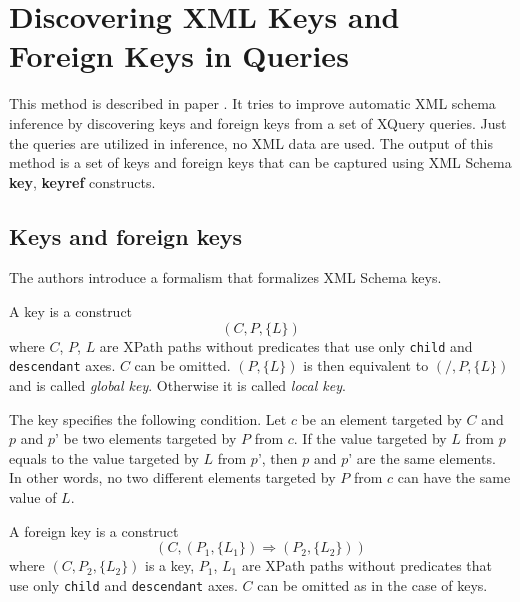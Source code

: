 
\section{Discovering XML Keys and Foreign Keys in Queries}
This method is described in paper \cite{Necasky:2009:DXK:1529282.1529414}. It tries to improve automatic XML schema inference by discovering keys and foreign keys from a set of XQuery queries. Just the queries are utilized in inference, no XML data are used. The output of this method is a set of keys and foreign keys that can be captured using XML Schema \textbf{key}, \textbf{keyref}  constructs.

\subsection{Keys and foreign keys}
The authors introduce a formalism that formalizes XML Schema keys.


\begin{define}[Key]
A key is a construct $$(C, P, \{L\})$$ where $C$, $P$, $L$ are XPath paths without predicates that use only \texttt{child} and \texttt{descendant} axes.
$C$ can be omitted. $(P, \{L\})$ is then equivalent to $(/, P, \{L\})$ and is called \emph{global key}. Otherwise it is called \emph{local key}.
\end{define}

The key specifies the following condition. Let $c$ be an element targeted by $C$ and $p$ and $p’$ be two elements targeted by $P$ from $c$. If the value targeted by $L$ from $p$ equals to the value targeted by $L$ from $p’$, then $p$ and $p’$ are the same elements. In other words, no two different elements targeted by $P$ from $c$ can have the same value of $L$.

\begin{define}
A foreign key is a construct $$(C, (P_1, \{L_1\}) \Rightarrow (P_2, \{L_2\}))$$ where $(C, P_2, \{L_2\})$ is a key, $P_1$, $L_1$ are XPath paths without predicates that use only \texttt{child} and \texttt{descendant} axes.
$C$ can be omitted as in the case of keys.
\end{define}

